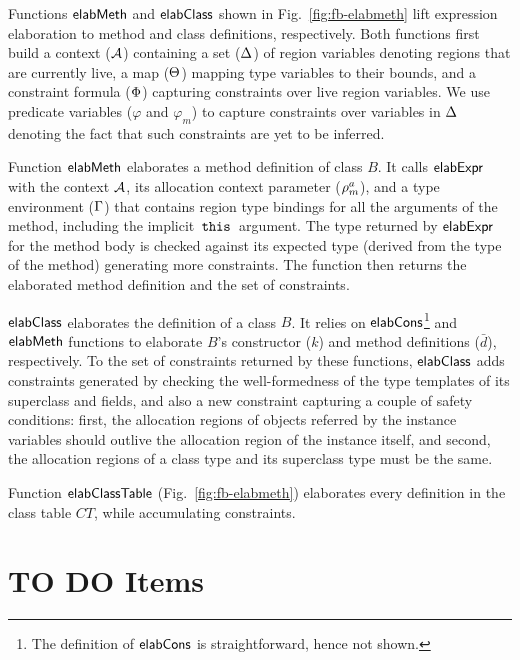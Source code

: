 Functions ${\sf elabMeth}$ and ${\sf elabClass}$ shown in
Fig.~\ref{fig:fb-elabmeth} lift expression elaboration to method and
class definitions, respectively. Both functions first build a context
(${\mathcal{A}}$) containing a set ($ \Delta$) of region variables denoting
regions that are currently live, a map ($\Theta$) mapping type
variables to their bounds, and a constraint formula ($\Phi$)
capturing constraints over live region variables. We use predicate
variables ($\varphi$ and $\varphi_m$) to capture constraints over
variables in $\Delta$ denoting the fact that such constraints are yet
to be inferred.

Function ${\sf elabMeth}$ elaborates a method definition of class $B$. It
calls ${\sf elabExpr}$ with the context ${\mathcal{A}}$, its allocation context
parameter ($\rho^a_m$), and a type environment ($\Gamma$) that
contains region type bindings for all the arguments of the method,
including the implicit $\,{\tt this}\,$ argument. The type 
returned by ${\sf elabExpr}$ for the method body is checked against its
expected type (derived from the type of the method)
generating more constraints. The function then returns the elaborated
method definition and the set of constraints.

${\sf elabClass}$ elaborates the definition of a class $B$. It relies on
${\sf elabCons}$\footnote{The definition of ${\sf elabCons}$ is straightforward,
hence not shown.} and ${\sf elabMeth}$ functions to elaborate $B$'s
constructor ($k$) and method definitions ($\bar{d}$), respectively. To
the set of constraints returned by these functions, ${\sf elabClass}$ adds
constraints generated by checking the well-formedness of the type
templates of its superclass and fields, and also a new constraint
capturing a couple of safety conditions: first, the allocation regions
of objects referred by the instance variables should outlive the
allocation region of the instance itself, and second, the allocation
regions of a class type and its superclass type must be the same.

Function ${\sf elabClassTable}$ (Fig.~\ref{fig:fb-elabmeth}) elaborates
every definition in the class table $CT$, while accumulating
constraints.

\section{TO DO Items}

